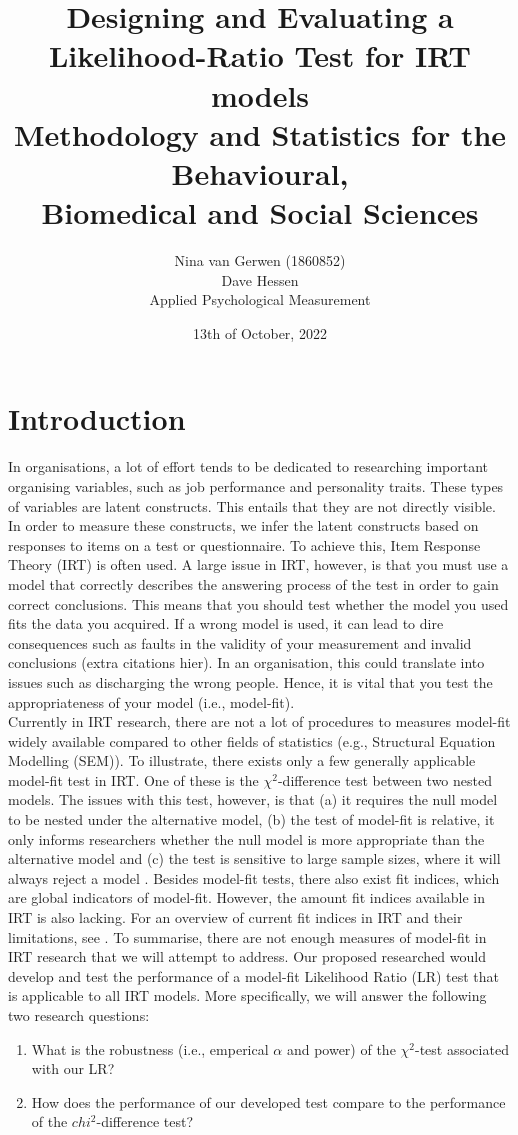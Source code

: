 \documentclass{article}
\title{%
	Designing and Evaluating a Likelihood-Ratio Test for IRT models \\
	\large Methodology and Statistics for the Behavioural, \\
	Biomedical and Social Sciences}
\author{Nina van Gerwen (1860852) \\
	Dave Hessen \\
	\small Applied Psychological Measurement}
\date{13th of October, 2022}
\begin{document}
\maketitle

\newpage

\part{Introduction}
In organisations, a lot of effort tends to be dedicated to researching important organising variables, such as job performance and personality traits. These types of variables are latent constructs. This entails that they are not directly visible. In order to measure these constructs, we infer the latent constructs based on responses to items on a test or questionnaire. To achieve this, Item Response Theory (IRT) is often used. A large issue in IRT, however, is that you must use a model that correctly describes the answering process of the test in order to gain correct conclusions. This means that you should test whether the model you used fits the data you acquired. If a wrong model is used, it can lead to dire consequences such as faults in the validity of your measurement \autocite{consq1} and invalid conclusions (extra citations hier). In an organisation, this could translate into issues such as discharging the wrong people. Hence, it is vital that you test the appropriateness of your model (i.e., model-fit). \\
\indent Currently in IRT research, there are not a lot of procedures to measures model-fit widely available compared to other fields of statistics (e.g., Structural Equation Modelling (SEM)). To illustrate, there exists only a few generally applicable model-fit test in IRT. One of these is the $\chi^2$-difference test between two nested models. The issues with this test, however, is that (a) it requires the null model to be nested under the alternative model, (b) the test of model-fit is relative, it only informs researchers whether the null model is more appropriate than the alternative model and (c) the test is sensitive to large sample sizes, where it will always reject a model \autocite{chi2sens}. Besides model-fit tests, there also exist fit indices, which are global indicators of model-fit. However, the amount fit indices available in IRT is also lacking. For an overview of current fit indices in IRT and their limitations, see \textcite{ref1}. To summarise, there are not enough measures of model-fit in IRT research that we will attempt to address.
\indent Our proposed researched would develop and test the performance of a model-fit Likelihood Ratio (LR) test that is applicable to all IRT models. More specifically, we will answer the following two research questions:
\begin{enumerate}
\item What is the robustness (i.e., emperical $\alpha$ and power) of the $\chi^2$-test associated with our LR?
\item How does the performance of our developed test compare to the performance of the $chi^2$-difference test?
\end{enumerate}
\end{document}
